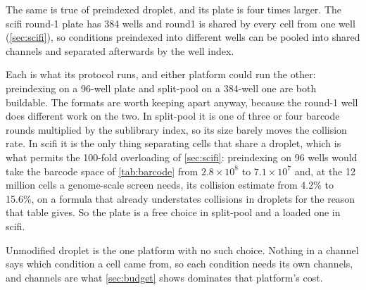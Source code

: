 The same is true of preindexed droplet, and its plate is four times larger. The
scifi round-1 plate has 384 wells and round1 is shared by every cell from one
well (\cref{sec:scifi}), so conditions preindexed into different wells can be
pooled into shared channels and separated afterwards by the well index.

 Each is what its
protocol runs, and either platform could run the other: preindexing on a 96-well
plate and split-pool on a 384-well one are both buildable. The formats are worth
keeping apart anyway, because the round-1 well does different work on the two.
In split-pool it is one of three or four barcode rounds multiplied by the
sublibrary index, so its size barely moves the collision rate. In scifi it is the
only thing separating cells that share a droplet, which is what permits the
100-fold overloading of \cref{sec:scifi}: preindexing on 96 wells would take the
barcode space of \cref{tab:barcode} from $2.8\times10^{8}$ to $7.1\times10^{7}$
and, at the 12 million cells a genome-scale screen needs, its collision estimate
from 4.2\% to 15.6\%, on a formula that already understates collisions in
droplets for the reason that table gives. So the plate is a free choice in
split-pool and a loaded one in scifi.

Unmodified droplet is the one platform with no such choice. Nothing in a channel
says which condition a cell came from, so each condition needs its own channels,
and channels are what \cref{sec:budget} shows dominates that platform's cost.

